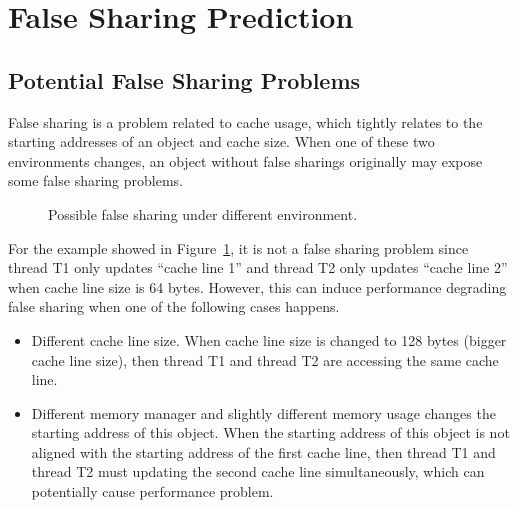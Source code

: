 \documentclass[10pt]{sigplanconf}
\begin{document}

\section{False Sharing Prediction}
\subsection{Potential False Sharing Problems}
False sharing is a problem related to cache usage, which tightly relates to the starting addresses of an object
and cache size. 
When one of these two environments changes, an object without false sharings originally may expose some false sharing
problems.

\begin{figure}[h]
{\centering
\caption{Possible false sharing under different environment.\label{fig:potentialfalsesharing}}
}
\end{figure}

For the example showed in Figure~\ref{fig:potentialfalsesharing}, it is not a false sharing problem since thread T1 only updates 
``cache line 1'' and thread T2 only updates ``cache line 2'' when cache line size is 64 bytes. However, this can induce performance degrading 
false sharing when one of the following cases happens.

\begin{itemize}
\item
Different cache line size. When cache line size is changed to 128 bytes (bigger cache line size), then thread T1 and thread T2 
are accessing the same cache line. 

\item
Different memory manager and slightly different memory usage changes the starting address of this object. When the starting address 
of this object is not aligned with the starting address of the first cache line, then thread T1 and thread T2 must updating 
the second cache line simultaneously, which can potentially cause performance problem. 
\end{itemize} 
\end{document}
